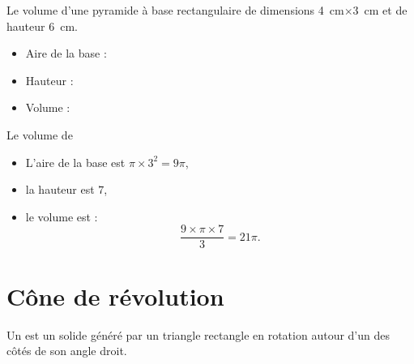 \begin{example}
    Le volume d'une pyramide à base rectangulaire de dimensions \SI{4}{\centi\meter}\( \times\)\SI{3}{\centi\meter} et de hauteur \SI{6}{\centi\meter}.

\begin{itemize}
    \item 
        Aire de la base : 
    \item
        Hauteur : 
    \item
        Volume :
\end{itemize}

\begin{center}         
                                                                  
\end{center}

\end{example}

\begin{example}
    Le volume de
\begin{center}
   
\end{center}

\begin{itemize}
    \item L'aire de la base est \( \pi\times 3^2=9\pi\),
    \item la hauteur est \( 7\),
    \item le volume est :
        \begin{equation}
            \frac{ 9\times \pi\times 7 }{ 3 }=21\pi.
        \end{equation}
\end{itemize}
\end{example}




\section{Cône de révolution}

\begin{definition}
    Un  est un solide généré par un triangle rectangle en rotation autour d'un des côtés de son angle droit.
\end{definition}



